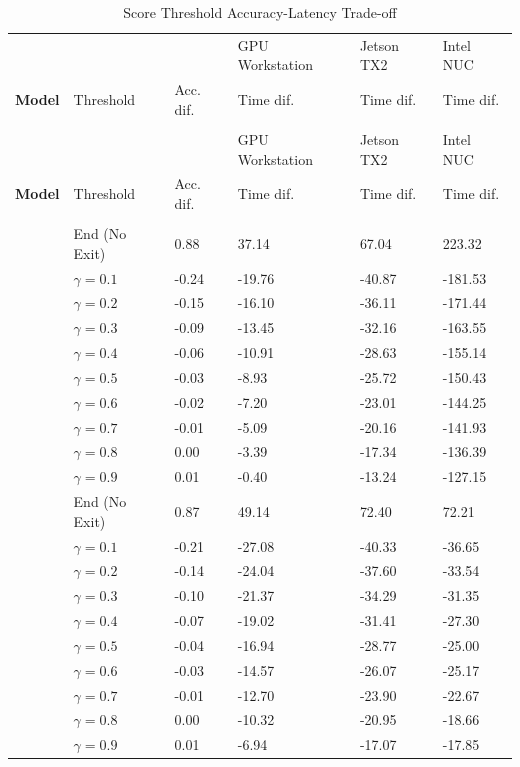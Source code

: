 \begin{minipage}[t]{\linewidth}
\begin{small}
	\begin{longtabu}{>{\bfseries}X|X|X[r]|X[r]|X[r]|X[r]}
		\caption[Score Threshold Accuracy-Latency Trade-off]{Score Threshold Accuracy-Latency Trade-off}\label{tbl:score-acc-lat-trade} \\
		\toprule
		\rowfont{\bfseries}
		& & & {GPU Workstation} &  {Jetson TX2} & {Intel NUC} \tabularnewline
		\rowfont{\bfseries} Model & Threshold & Acc. dif. & Time dif.  & Time dif. & Time dif. \tabularnewline
		\hline
		\endfirsthead
		\\
		\toprule
		\rowfont{\bfseries}
		& &  & {GPU Workstation} &  {Jetson TX2} & {Intel NUC} \tabularnewline
		\rowfont{\bfseries} Model & Threshold & Acc. dif. & Time dif.  & Time dif. & Time dif. \tabularnewline
		\hline
		\endhead %
		\hline
		\\
		\endfoot
		\hline
		 & End (No Exit) & 0.88 & 37.14 & 67.04 & 223.32  \tabularnewline {}
		& $ \gamma = 0.1 $ 	& -0.24 & -19.76 & -40.87 & -181.53 \tabularnewline
		&$ \gamma = 0.2 $ 	& -0.15 & -16.10 & -36.11 & -171.44 \tabularnewline 
		&$ \gamma = 0.3 $ 	& -0.09 & -13.45 & -32.16 & -163.55 \tabularnewline
		&$ \gamma = 0.4 $ 	& -0.06 & -10.91 & -28.63 & -155.14 \tabularnewline 
		&$ \gamma = 0.5 $ 	& -0.03 &  -8.93 & -25.72 & -150.43 \tabularnewline
		&$ \gamma = 0.6 $ 	& -0.02 &  -7.20 & -23.01 & -144.25 \tabularnewline 
		&$ \gamma = 0.7 $ 	& -0.01 &  -5.09 & -20.16 & -141.93 \tabularnewline 
		&$ \gamma = 0.8 $ 	&  0.00 &  -3.39 & -17.34 & -136.39 \tabularnewline 
		&$ \gamma = 0.9 $ 	&  0.01 &  -0.40 & -13.24 & -127.15 \tabularnewline 
		\hline
		 & End (No Exit) & 0.87 & 49.14 & 72.40 & 72.21 \tabularnewline {}
		&$ \gamma = 0.1 $ 	& -0.21 & -27.08 & -40.33 & -36.65  \tabularnewline
		&$ \gamma = 0.2 $ 	& -0.14 & -24.04 & -37.60 & -33.54  \tabularnewline 
		&$ \gamma = 0.3 $ 	& -0.10 & -21.37 & -34.29 & -31.35  \tabularnewline
		&$ \gamma = 0.4 $ 	& -0.07 & -19.02 & -31.41 & -27.30  \tabularnewline 
		&$ \gamma = 0.5 $ 	& -0.04 & -16.94 & -28.77 & -25.00  \tabularnewline
		&$ \gamma = 0.6 $ 	& -0.03 & -14.57 & -26.07 & -25.17  \tabularnewline 
		&$ \gamma = 0.7 $ 	& -0.01 & -12.70 & -23.90 & -22.67  \tabularnewline 
		&$ \gamma = 0.8 $ 	&  0.00 & -10.32 & -20.95 & -18.66  \tabularnewline 
		&$ \gamma = 0.9 $ 	&  0.01 &  -6.94 & -17.07 & -17.85  \tabularnewline 

\end{longtabu}
\end{small}
\end{minipage}
